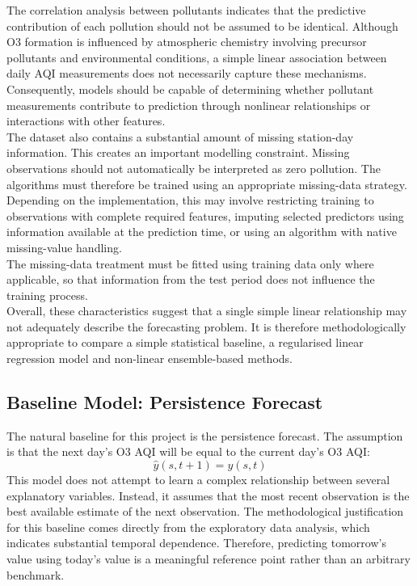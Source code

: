 \documentclass[11pt,a4paper]{article}
\begin{document}
\noindent
The correlation analysis between pollutants indicates that the predictive contribution of each pollution should not be assumed to be identical. Although O3 formation is influenced by atmospheric chemistry involving precursor pollutants and environmental conditions, a simple linear association between daily AQI measurements does not necessarily capture these mechanisms. Consequently, models should be capable of determining whether pollutant measurements contribute to prediction through nonlinear relationships or interactions with other features.\\

\noindent
The dataset also contains a substantial amount of missing station-day information. This creates an important modelling constraint. Missing observations should not automatically be interpreted as zero pollution. The algorithms must therefore be trained using an appropriate missing-data strategy. Depending on the implementation, this may involve restricting training to observations with complete required features, imputing selected predictors using information available at the prediction time, or using an algorithm with native missing-value handling.\\

\noindent
The missing-data treatment must be fitted using training data only where applicable, so that information from the test period does not influence the training process.\\

\noindent
Overall, these characteristics suggest that a single simple linear relationship may not adequately describe the forecasting problem. It is therefore methodologically appropriate to compare a simple statistical baseline, a regularised linear regression model and non-linear ensemble-based methods.

\subsection{Baseline Model: Persistence Forecast}
The natural baseline for this project is the persistence forecast. The assumption is that the next day's O3 AQI will be equal to the current day's O3 AQI:
\begin{equation}
    \hat{y}(s, t+1)=y(s,t)
\end{equation}
\noindent
This model does not attempt to learn a complex relationship between several explanatory variables. Instead, it assumes that the most recent observation is the best available estimate of the next observation. The methodological justification for this baseline comes directly from the exploratory data analysis, which indicates substantial temporal dependence. Therefore, predicting tomorrow's value using today's value is a meaningful reference point rather than an arbitrary benchmark.\\
\end{document}
